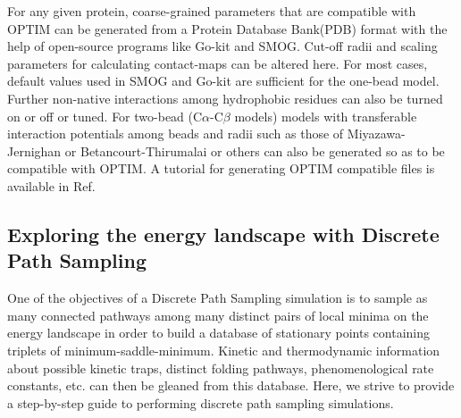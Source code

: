 \documentclass[journal=jacsat]{achemso}
\begin{document}
For any given protein, coarse-grained parameters that are compatible with OPTIM can be generated from a Protein Database Bank(PDB)\cite{PDB} format  with the help of open-source programs like Go-kit\cite{Neelamraju19a} and SMOG\cite{smog}. Cut-off radii and scaling parameters for calculating contact-maps can be altered here. For most cases, default values used in SMOG\cite{smog} and Go-kit\cite{Neelamraju18a} are sufficient for the one-bead model. Further non-native interactions among hydrophobic residues can also be turned on or off or tuned. For two-bead (C$\alpha$-C$\beta$ models) models with transferable interaction potentials among beads and radii such as those of Miyazawa-Jernighan\cite{Miyazawa99a,Miyazawa85a,Zeng12a} or Betancourt-Thirumalai\cite{Betancourt95a,Betancourt99a} or others \cite{Honeycutt90a,Cieplak09a,Lammert09,Dill89a} can also be generated so as to be compatible with OPTIM\cite{OPTIM}. A tutorial for generating OPTIM compatible files is available in Ref\cite{Neelamraju19a}.

\subsection{Exploring the energy landscape with Discrete Path Sampling}
One of the objectives of a Discrete Path Sampling simulation is to sample as many connected pathways among many distinct pairs of local minima on the energy landscape in order to build a database of stationary points containing triplets of minimum-saddle-minimum. Kinetic and thermodynamic information about possible kinetic traps, distinct folding pathways, phenomenological rate constants, etc. can then be gleaned from this database. Here, we strive to provide a step-by-step guide to performing discrete path sampling simulations.
\end{document}
